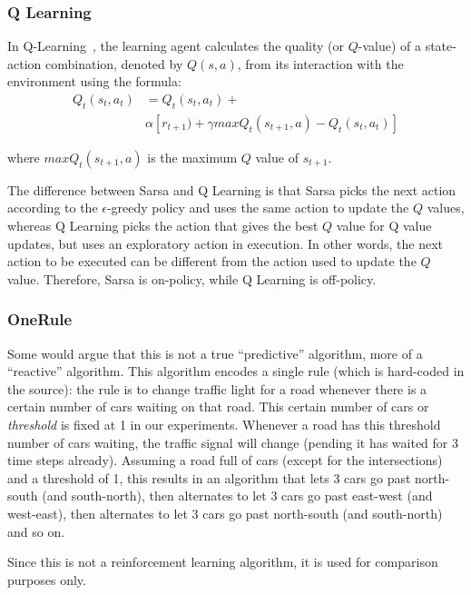 \subsubsection{Q Learning}

In Q-Learning~\cite{watkins_qlearning_1992}, the learning agent calculates the quality (or $Q$-value) of a state-action combination, denoted by $Q(s, a)$, from its interaction with the environment using the formula:
\begin{equation}
\begin{aligned}
Q_t(s_t, a_t) &= Q_t(s_t, a_t) + \\
&\alpha [r_{t+1}) + \gamma max Q_t(s_{t+1}, a) - Q_t(s_t, a_t)]
\end{aligned}
\label{equ:qupdate}
\end{equation}

where $max Q_t(s_{t+1}, a)$ is the maximum $Q$ value of $s_{t+1}$.

The difference between Sarsa and Q Learning is that Sarsa picks the next action according to the $\epsilon $-greedy policy and uses the same action to update the $Q$ values, whereas Q Learning
picks the action that gives the best $Q$ value for Q value updates, but uses an exploratory action in execution. In other words, the next action to be executed can be different from the action used to update the $Q$ value. Therefore, Sarsa is on-policy, while Q Learning is off-policy.

\subsubsection{OneRule}

Some would argue that this is not a true ``predictive''
algorithm, more of a ``reactive'' algorithm. This algorithm
encodes a single rule (which is hard-coded in the source):
the rule is to change traffic light for a road
whenever there is a certain number of cars
waiting on that road. This certain number
of cars or \emph{threshold} is fixed at 1 in our experiments.
Whenever a road has this threshold number of cars waiting, the traffic
signal will change (pending it has waited for 3 time steps already).
Assuming a road full of cars (except for the intersections) and
a threshold of 1, this results in an algorithm that lets 3 cars go past north-south
(and south-north), then alternates to let 3 cars go past east-west (and
west-east), then alternates to let 3 cars go
past north-south (and south-north) and so on.

Since this is not a reinforcement learning algorithm, it is
used for comparison purposes only.

